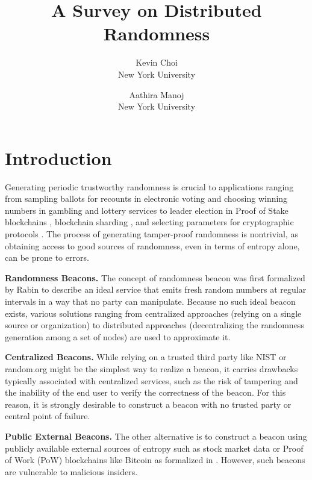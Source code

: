 \documentclass[letterpaper,twocolumn,10pt]{article}
\title{\Large \bf A Survey on Distributed Randomness}
\author{
{\rm Kevin Choi}\\
New York University
\and
{\rm Aathira Manoj}\\
New York University
}
\theoremstyle{definition}
\theoremstyle{remark}
\begin{document}
\maketitle
\tableofcontents

\section{Introduction}
Generating periodic trustworthy randomness is crucial to applications ranging from sampling ballots for recounts in electronic voting \cite{adida2008helios} and choosing winning numbers in gambling and lottery services \cite{bonneau2015bitcoin} to leader election in Proof of Stake blockchains \cite{gilad2017algorand, kiayias2017ouroboros}, blockchain sharding \cite{al2017chainspace, kokoris2018omniledger, luu2016secure}, and selecting parameters for cryptographic protocols \cite{baigneres2015trap, lenstra2015random}. The process of generating tamper-proof randomness is nontrivial, as obtaining access to good sources of randomness, even in terms of entropy alone, can be prone to errors.

\textbf{Randomness Beacons.} The concept of randomness beacon was first formalized by Rabin \cite{rabin1983Rabin} to describe an ideal service that emits fresh random numbers at regular intervals in a way that no party can manipulate. Because no such ideal beacon exists, various solutions ranging from centralized approaches (relying on a single source or organization) to distributed approaches (decentralizing the randomness generation among a set of nodes) are used to approximate it.

\textbf{Centralized Beacons.} While relying on a trusted third party like NIST \cite{fischer2011public} or random.org \cite{haahr2010random} might be the simplest way to realize a beacon, it carries drawbacks typically associated with centralized services, such as the risk of tampering and the inability of the end user to verify the correctness of the beacon. For this reason, it is strongly desirable to construct a beacon with no trusted party or central point of failure.

\textbf{Public External Beacons.} The other alternative is to construct a beacon using publicly available external sources of entropy such as stock market data \cite{clark2010use} or Proof of Work (PoW) blockchains like Bitcoin \cite{nakamoto2019bitcoin, han2020randchain} as formalized in \cite{bonneau2015bitcoin}. However, such beacons are vulnerable to malicious insiders.
\end{document}
